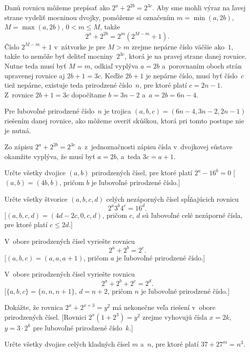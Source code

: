 {%
Danú rovnicu môžeme prepísať ako $2^a+2^{2b}=2^{3c}$.
Aby sme mohli výraz na ľavej strane vydeliť mocninou dvojky, pomôžeme si
označením $m=\min(a, 2b)$, $M=\max(a, 2b)$, $0<m\le M$, takže
$$
2^a+2^{2b}=2^m(2^{M-m}+1).
$$
Číslo $2^{M-m}+1$ v~zátvorke je pre $M>m$ zrejme nepárne číslo väčšie ako~$1$,
takže to nemôže byť deliteľ mocniny~$2^{3c}$, ktorá je na pravej
strane danej rovnice. Nutne teda musí byť
$M=m$, odkiaľ vyplýva $a=2b$ a~porovnaním oboch strán upravenej rovnice
aj $2b+1=3c$. Keďže $2b+1$ je nepárne číslo, musí byť číslo~$c$
tiež nepárne, existuje teda prirodzené číslo~$n$, pre ktoré platí $c=2n-1$.
Z~rovnice $2b+1=3c$ dopočítame $b=3n-2$ a~$a=2b=6n-4$.

Pre ľubovoľné prirodzené číslo~$n$ je trojica $(a,b,c)=(6n-4, 3n-2, 2n-1)$
riešením danej rovnice, ako môžeme overiť skúškou, ktorá pri tomto postupe
nie je nutná.

\poznamka
Zo zápisu $2^a+2^{2b}=2^{3c}$ a~z~jednoznačnosti zápisu čísla v~dvojkovej sústave
okamžite vyplýva, že musí byť $a=2b$, a~teda $3c=a+1$.

Určte všetky dvojice $(a,b)$ prirodzených čísel, pre ktoré platí
$2^a-16^b=0$ [$(a,b)=(4b,b)$, pričom $b$ je ľubovoľné prirodzené číslo.]

Určte všetky štvorice $(a,b,c,d)$ celých nezáporných čísel spĺňajúcich
rovnicu
$$
2^a3^b4^c=16^d.
$$
[$(a,b,c,d)=(4d-2c, 0,c,d)$, pričom $c$, $d$ sú ľubovoľné
celé nezáporné čísla, pre ktoré platí $c\le 2d$.]

V~obore prirodzených čísel vyriešte rovnicu
$$
2^a+2^b=2^c.
$$
[$(a,b,c)=(a,a,a+1)$, pričom $a$ je ľubovoľné prirodzené číslo.]

V~obore prirodzených čísel vyriešte rovnicu
$$
2^a+2^b+2^c=2^d.
$$
[$\{a,b,c\}=\{n,n,n+1\}$, $d=n+2$, pričom $n$ je ľubovoľné prirodzené číslo.]

\D
Dokážte, že rovnica $2^x+2^{x+3}=y^2$ má nekonečne veľa riešení v~obore
prirodzených čísel.
[Rovnici $2^x(1+2^{3})=y^2$ zrejme vyhovujú čísla $x=2k$, $y=3\cdot2^k$
pre ľubovoľné prirodzené číslo~$k$.]

Určte všetky dvojice celých kladných čísel $m$ a~$n$, pre ktoré platí
$37+27^m= n^3$.
\vpravo{[59--B--S--1]}
}

